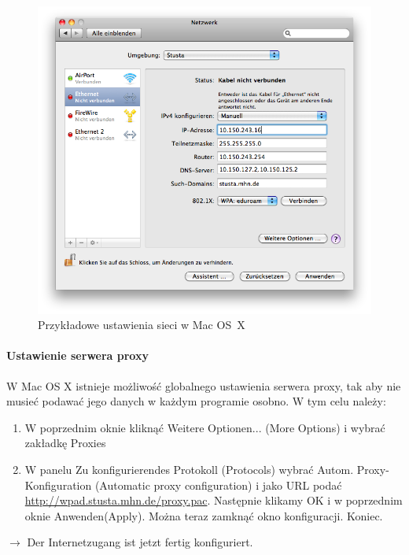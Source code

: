 \documentclass[a4paper,12pt]{scrartcl}
\begin{document}
\begin{enumerate}
\begin{figure}[h!]
\begin{minipage}[c]{0.38\linewidth}
        \end{minipage}
        \begin{minipage}[c]{0.60\linewidth}
          \centering
          \includegraphics[width=\linewidth,keepaspectratio]{Bilder/IP_MAC}
          \caption{Przykładowe ustawienia sieci w Mac OS~X}
        \end{minipage}
      \end{figure}
\end{enumerate}

\paragraph*{Ustawienie serwera proxy}
W Mac OS X istnieje możliwość globalnego ustawienia serwera proxy, tak aby nie musieć podawać jego danych w każdym programie osobno. W tym celu należy:
\begin{enumerate}
    \item W poprzednim oknie kliknąć Weitere Optionen... (More Options) i wybrać zakładkę Proxies
    \item W panelu Zu konfigurierendes Protokoll (Protocols) wybrać Autom. Proxy-Konfiguration (Automatic proxy configuration) i jako URL podać \url{http://wpad.stusta.mhn.de/proxy.pac}. Następnie klikamy OK i w poprzednim oknie Anwenden(Apply). Można teraz zamknąć okno konfiguracji. Koniec.
\end{enumerate}
$\rightarrow$ Der Internetzugang ist jetzt fertig konfiguriert.
\end{document}
